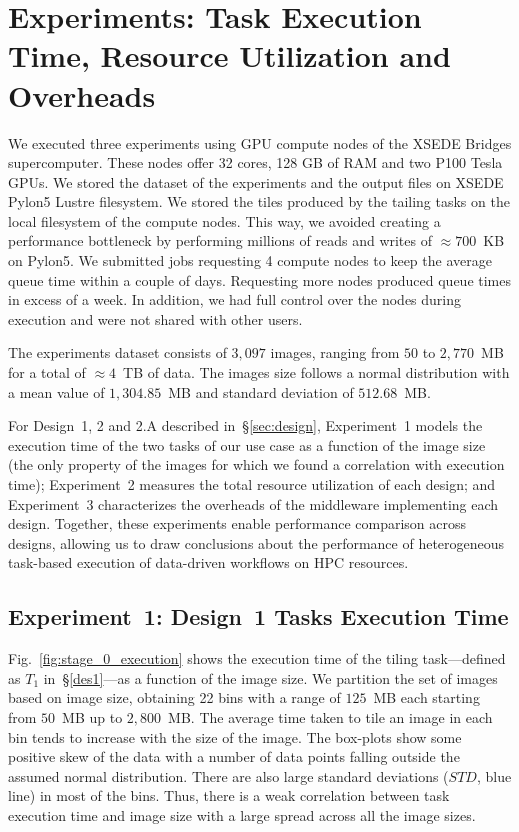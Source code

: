 \section{Experiments: Task Execution Time, Resource Utilization and Overheads}\label{sec:des_experiments}
We executed three experiments using GPU compute nodes of the XSEDE Bridges supercomputer.
These nodes offer 32 cores, 128 GB of RAM and two P100 Tesla GPUs.
We stored the dataset of the experiments and the output files on XSEDE Pylon5 Lustre filesystem.
We stored the tiles produced by the tailing tasks on the local filesystem of the compute nodes.
This way, we avoided creating a performance bottleneck by performing millions of reads and writes of $\approx700$~KB on Pylon5.
We submitted jobs requesting 4 compute nodes to keep the average queue time within a couple of days.
Requesting more nodes produced queue times in excess of a week.
In addition, we had full control over the nodes during execution and were not shared with other users.

The experiments dataset consists of $3,097$ images, ranging from $50$ to $2,770$~MB for a total of $\approx4$~TB of data.
The images size follows a normal distribution with a mean value of $1,304.85$~MB and standard deviation of $512.68$~MB.

For Design~1, 2 and 2.A described in~\S\ref{sec:design}, Experiment~1 models the execution time of the two tasks of our use case as a function of the image size (the only property of the images for which we found a correlation with execution time); Experiment~2 measures the total resource utilization of each design; and Experiment~3 characterizes the overheads of the middleware implementing each design.
Together, these experiments enable performance comparison across designs, allowing us to draw conclusions about the performance of heterogeneous task-based execution of data-driven workflows on HPC resources.

\subsection{Experiment~1: Design~1 Tasks Execution Time}
\label{ssec:des1analysis}


Fig.~\ref{fig:stage_0_execution} shows the execution time of the tiling task---defined as $T_{1}$ in~\S\ref{des1}---as a function of the image size.
We partition the set of images based on image size, obtaining 22 bins with a range of $125$~MB each starting from $50$~MB up to $2,800$~MB.
The average time taken to tile an image in each bin tends to increase with the size of the image.
The box-plots show some positive skew of the data with a number of data points  falling outside the assumed normal distribution.
There are also large standard  deviations ($STD$, blue line) in most of the bins.
Thus, there is a weak correlation between task execution time and image size with a large spread  across all the image sizes.

